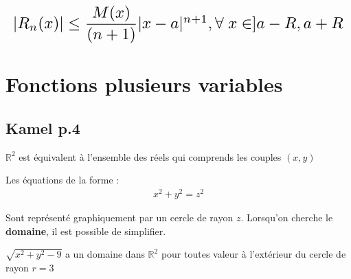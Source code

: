 \documentclass{report}
\begin{document}
\begin{multicols*}{3}
     \begin{align*}
         \resizebox{1\linewidth}{!}{$ 
         |R_n(x)| \leq \dfrac{M(x)}{(n + 1)}|x - a|^{n+1}, 
         \forall \; x \in ]a - R, a + R
    $}
     \end{align*}               

     \chapter{Fonctions plusieurs variables}


     \section{Kamel p.4}
     $\mathbb{R}^2$ est équivalent à l'ensemble des réels qui comprends 
     les couples $(x, y)$


     Les équations de la forme : 
     \begin{align*}
            x^2 + y^2 = z^2
     \end{align*}

     Sont représenté graphiquement par un cercle de rayon $z$.  
     Lorsqu'on cherche le \textbf{domaine}, il est possible de  
     simplifier.


     \begin{EExample}{}{}
         $\sqrt{x^2 + y^2 - 9}$ a un domaine dans $\mathbb{R}^2$ pour 
         toutes valeur à l'extérieur du cercle de rayon $r = 3$ 
     \end{EExample}


        






\end{multicols*}
\end{document}
